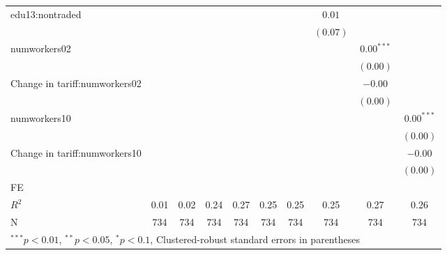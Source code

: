 \begin{tabular}{l c c c c c c c c c }
edu13:nontraded      &              &               &              &               &              &              & $0.01$       &               &              \\
                     &              &               &              &               &              &              & $(0.07)$     &               &              \\
numworkers02         &              &               &              &               &              &              &              & $0.00^{***}$  &              \\
                     &              &               &              &               &              &              &              & $(0.00)$      &              \\
Change in tariff:numworkers02 &              &               &              &               &              &              &              & $-0.00$       &              \\
                     &              &               &              &               &              &              &              & $(0.00)$      &              \\
numworkers10         &              &               &              &               &              &              &              &               & $0.00^{***}$ \\
                     &              &               &              &               &              &              &              &               & $(0.00)$     \\
Change in tariff:numworkers10 &              &               &              &               &              &              &              &               & $-0.00$      \\
                     &              &               &              &               &              &              &              &               & $(0.00)$     \\
\hline
FE          &                &                &                &                &                &                &                &                &                \\ 
\hline
$R^2$                & 0.01         & 0.02          & 0.24         & 0.27          & 0.25         & 0.25         & 0.25         & 0.27          & 0.26         \\
N                    & 734          & 734           & 734          & 734           & 734          & 734          & 734          & 734           & 734          \\
\hline
\multicolumn{10}{l}{\scriptsize{$^{***}p<0.01$, $^{**}p<0.05$, $^*p<0.1$, Clustered-robust standard errors in parentheses}}
\end{tabular}
